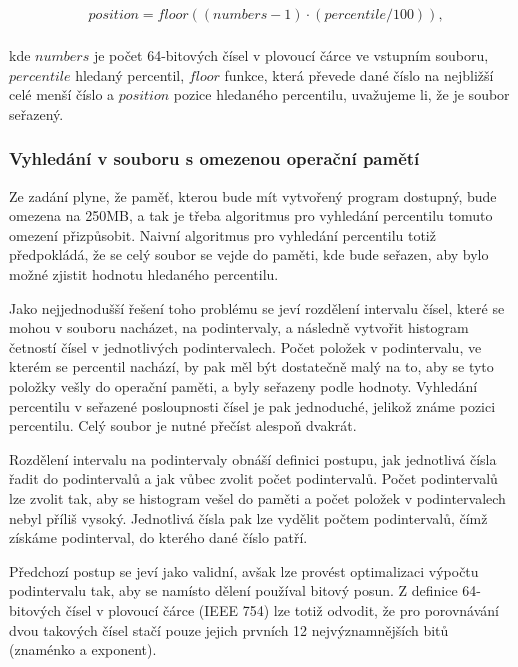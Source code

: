 \documentclass[12pt, a4paper]{article}
\begin{document}
\begin{equation}
    \begin{split}
    & position = floor((numbers - 1) \cdot (percentile / 100)), \\ 
    \end{split}
\end{equation}

kde $numbers$ je počet 64-bitových čísel v plovoucí čárce ve vstupním souboru, $percentile$ hledaný percentil, $floor$ funkce, která převede dané číslo na nejbližší celé menší číslo a $position$ pozice hledaného percentilu, uvažujeme li, že je soubor seřazený.

\subsubsection{Vyhledání v souboru s omezenou operační pamětí}\label{bucketing}
Ze zadání plyne, že paměť, kterou bude mít vytvořený program dostupný, bude omezena na 250MB, a tak je třeba algoritmus pro vyhledání percentilu tomuto omezení přizpůsobit.
Naivní algoritmus pro vyhledání percentilu totiž předpokládá, že se celý soubor se vejde do paměti, kde bude seřazen, aby bylo možné zjistit hodnotu hledaného percentilu.

Jako nejjednodušší řešení toho problému se jeví rozdělení intervalu čísel, které se mohou v souboru nacházet, na podintervaly, a následně vytvořit histogram četností čísel v jednotlivých podintervalech. 
Počet položek v podintervalu, ve kterém se percentil nachází, by pak měl být dostatečně malý na to, aby se tyto položky vešly do operační paměti, a byly seřazeny podle hodnoty.
Vyhledání percentilu v seřazené posloupnosti čísel je pak jednoduché, jelikož známe pozici percentilu. Celý soubor je nutné přečíst alespoň dvakrát.

Rozdělení intervalu na podintervaly obnáší definici postupu, jak jednotlivá čísla řadit do podintervalů a jak vůbec zvolit počet podintervalů. 
Počet podintervalů lze zvolit tak, aby se histogram vešel do paměti a počet položek v podintervalech nebyl příliš vysoký. Jednotlivá čísla pak lze vydělit počtem podintervalů, čímž získáme podinterval, do kterého dané číslo patří.

Předchozí postup se jeví jako validní, avšak lze provést optimalizaci výpočtu podintervalu tak, aby se namísto dělení používal bitový posun.
Z definice 64-bitových čísel v plovoucí čárce (IEEE 754) lze totiž odvodit, že pro porovnávání dvou takových čísel stačí pouze jejich prvních 12 nejvýznamnějších bitů (znaménko a exponent).
\end{document}
